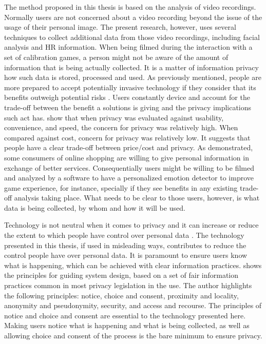 The method proposed in this thesis is based on the analysis of video recordings. Normally users are not concerned about a video recording beyond the issue of the usage of their personal image. The present research, however, uses several techniques to collect additional data from those video recordings, including facial analysis and HR information. When being filmed during the interaction with a set of calibration games, a person might not be aware of the amount of information that is being actually collected. It is a matter of information privacy how such data is stored, processed and used. As previously mentioned, people are more prepared to accept potentially invasive technology if they consider that its benefits outweigh potential risks \parencite{ladd1991computers}. Users constantly device and account for the trade-off between the benefit a solutions is giving and the privacy implications such act has. \textcite{nguyen2016effects} show that when privacy was evaluated against usability, convenience, and speed, the concern for privacy was relatively high. When compared against cost, concern for privacy was relatively low. It suggests that people have a clear trade-off between price/cost and privacy. As \textcite{awad2006personalization} demonstrated, some consumers of online shopping are willing to give personal information in exchange of better services. Consequentially users might be willing to be filmed and analyzed by a software to have a personalized emotion detector to improve game experience, for instance, specially if they see benefits in any existing trade-off analysis taking place. What needs to be clear to those users, however, is what data is being collected, by whom and how it will be used.

Technology is not neutral when it comes to privacy and it can increase or reduce the extent to which people have control over personal data \parencite{bellotti1993design}. The technology presented in this thesis, if used in misleading ways, contributes to reduce the control people have over personal data. It is paramount to ensure users know what is happening, which can be achieved with clear information practices. \textcite{langheinrich2001privacy} shows the principles for guiding system design, based on a set of fair information practices common in most privacy legislation in the use. The author highlights the following principles: notice, choice and consent, proximity and locality, anonymity and pseudonymity, security, and access and recourse. The principles of notice and choice and consent are essential to the technology presented here. Making users notice what is happening and what is being collected, as well as allowing choice and consent of the process is the bare minimum to ensure privacy.
